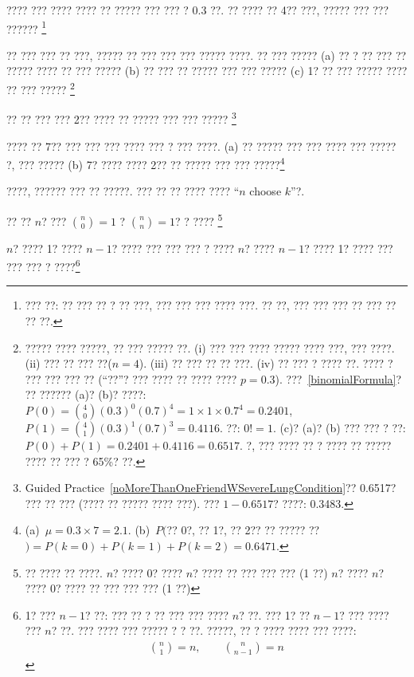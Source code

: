 \begin{exercise}
???? ??? ???? ???? ?? ????? ??? ??? ? 0.3 ??. ?? ???? ?? 4?? ???, ????? ??? ??? ?????? \footnote{??? ??: ?? ??? ?? ? ?? ???, ??? ??? ??? ???? ???. ?? ??, ??? ??? ??? ?? ??? ?? ?? ??.}
\end{exercise}

\begin{exercise}
\label{noMoreThanOneFriendWSevereLungCondition}%
?? ??? ??? ?? ???, ????? ?? ??? ??? ??? ????? ????. ?? ??? ????? (a) ?? ? ?? ??? ?? ????? ???? ?? ??? ????? (b) ?? ??? ?? ????? ??? ??? ????? (c) 1? ?? ??? ????? ???? ?? ??? ?????
\footnote{????? ???? ?????, ?? ??? ????? ??. (i) ??? ??? ???? ????? ???? ???, ??? ????. (ii) ??? ?? ??? ??($n=4$). (iii) ?? ??? ?? ?? ???. (iv) ?? ??? ? ???? ??. ???? ? ??? ??? ??? ?? (``??''? ??? ???? ?? ???? ???? $p=0.3$). ???~\eqref{binomialFormula}? ?? ?????? (a)? (b)? ????: $P(0) =  {4 \choose 0} (0.3)^0 (0.7)^4 = 1\times1\times0.7^4 = 0.2401$, $P(1) = {4 \choose 1} (0.3)^1(0.7)^{3} = 0.4116$. ??: $0!=1$. (c)? (a)? (b) ??? ??? ? ??: $P(0) + P(1) = 0.2401 + 0.4116 = 0.6517$. ?, ??? ???? ?? ? ???? ?? ????? ???? ?? ??? ? 65\%? ??.}
\end{exercise}

\begin{exercise}
?? ?? ??? ??? 2?? ???? ?? ????? ??? ??? ?????
\footnote{Guided Practice~\ref{noMoreThanOneFriendWSevereLungCondition}?? 0.6517? ??? ?? ??? (???? ?? ????? ???? ???). ??? $1 - 0.6517$? ????: 0.3483.}
\end{exercise}

\begin{exercise}
???? ?? 7?? ??? ??? ??? ???? ??? ? ??? ????. (a) ?? ????? ??? ??? ???? ??? ????? ?, ??? ????? (b) 7? ???? ???? 2?? ?? ????? ??? ??? ?????\footnote{(a)~$\mu=0.3\times7 = 2.1$. (b)~$P($?? 0?, ??  1?, ?? 2?? ?? ????? ?? $) = P(k=0) + P(k=1)+P(k=2) = 0.6471$.}
\end{exercise}

????, ?????? ??? ?? ?????. ??? ?? ?? ???? ???? ``$n$ choose $k$''?.

\begin{exercise}
?? ?? $n$? ??? ${n \choose 0}=1$ ? ${n \choose n}=1$? ? ????
\footnote{?? ???? ?? ????. $n$? ???? 0? ???? $n$? ???? ?? ??? ??? ??? (1 ??) $n$? ???? $n$? ???? 0? ???? ?? ??? ??? ??? (1 ??) }
\end{exercise}

\begin{exercise}
$n$? ???? 1? ???? $n-1$? ???? ??? ??? ??? ? ???? $n$? ???? $n-1$? ???? 1? ???? ??? ??? ??? ? ????\footnote{1? ??? $n-1$? ??: 
??? ?? ? ?? ??? ??? ???? $n$? ??. ??? 1? ?? $n-1$? ??? ???? ??? $n$? ??. ??? ???? ??? ????? ? ? ??. ?????, ?? ? ???? ???? ??? ????:
\begin{eqnarray*}
{n \choose 1} = n, \qquad {n \choose n-1} = n
\end{eqnarray*}}
\end{exercise}

